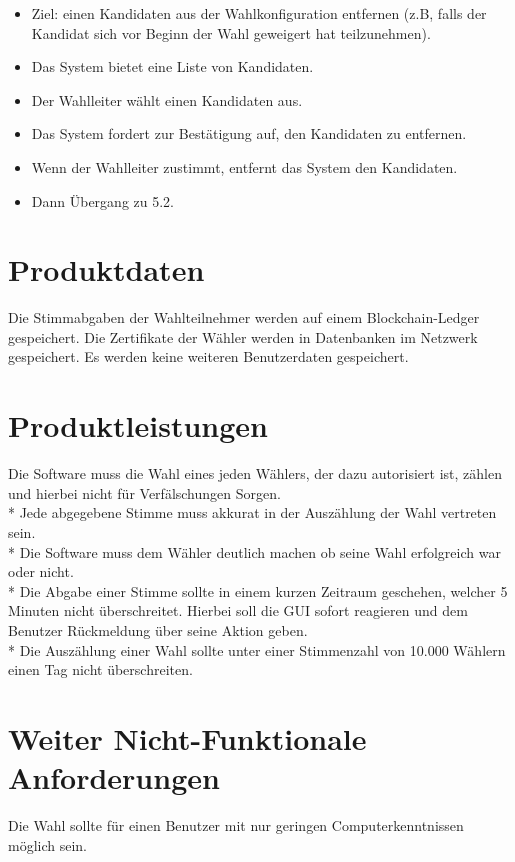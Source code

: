 \documentclass[parskip=full,11pt,twoside]{scrartcl}
\begin{document}
\begin{itemize}
	\item Ziel: einen Kandidaten aus der Wahlkonfiguration entfernen (z.B, falls der Kandidat sich vor Beginn der Wahl geweigert hat teilzunehmen).
	\item Das System bietet eine Liste von Kandidaten.
	\item Der Wahlleiter wählt einen Kandidaten aus.
	\item Das System fordert zur Bestätigung auf, den Kandidaten zu entfernen.
	\item Wenn der Wahlleiter zustimmt, entfernt das System den Kandidaten.
	\item Dann Übergang zu 5.2.
\end{itemize}

\section{Produktdaten}

Die Stimmabgaben der Wahlteilnehmer werden auf einem Blockchain-Ledger gespeichert.
Die Zertifikate der Wähler werden in Datenbanken im Netzwerk gespeichert.
Es werden keine weiteren Benutzerdaten gespeichert.

\section{Produktleistungen}
Die Software muss die Wahl eines jeden Wählers, der dazu autorisiert ist, zählen und hierbei nicht für Verfälschungen Sorgen. \\*
Jede abgegebene Stimme muss akkurat in der Auszählung der Wahl vertreten sein. \\*
Die Software muss dem Wähler deutlich machen ob seine Wahl erfolgreich war oder nicht. \\*
Die Abgabe einer Stimme sollte in einem kurzen Zeitraum geschehen, welcher 5 Minuten nicht überschreitet.
Hierbei soll die GUI sofort reagieren und dem Benutzer Rückmeldung über seine Aktion geben. \\*
Die Auszählung einer Wahl sollte unter einer Stimmenzahl von 10.000 Wählern einen Tag nicht überschreiten. 


\section{Weiter Nicht-Funktionale Anforderungen}

Die Wahl sollte für einen Benutzer mit nur geringen Computerkenntnissen möglich sein.
\end{document}
